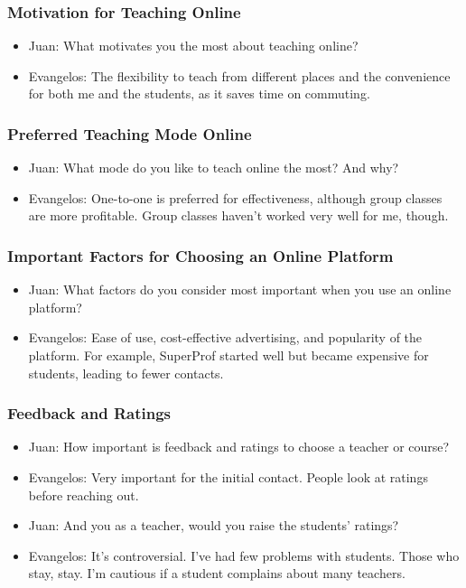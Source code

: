 \begin{enumerate}
    \subsubsection*{Motivation for Teaching Online}
    \begin{itemize}
        \item Juan: What motivates you the most about teaching online?
        \item Evangelos: The flexibility to teach from different places and the convenience for both me and the students, as it saves time on commuting.
    \end{itemize}

    \subsubsection*{Preferred Teaching Mode Online}
    \begin{itemize}
        \item Juan: What mode do you like to teach online the most?
        And why?
        \item Evangelos: One-to-one is preferred for effectiveness, although group classes are more profitable.
        Group classes haven’t worked very well for me, though.
    \end{itemize}

    \subsubsection*{Important Factors for Choosing an Online Platform}
    \begin{itemize}
        \item Juan: What factors do you consider most important when you use an online platform?
        \item Evangelos: Ease of use, cost-effective advertising, and popularity of the platform.
        For example, SuperProf started well but became expensive for students, leading to fewer contacts.
    \end{itemize}

    \subsubsection*{Feedback and Ratings}
    \begin{itemize}
        \item Juan: How important is feedback and ratings to choose a teacher or course?
        \item Evangelos: Very important for the initial contact.
        People look at ratings before reaching out.
        \item Juan: And you as a teacher, would you raise the students' ratings?
        \item Evangelos: It’s controversial.
        I’ve had few problems with students.
        Those who stay, stay.
        I’m cautious if a student complains about many teachers.
    \end{itemize}


\end{enumerate}
